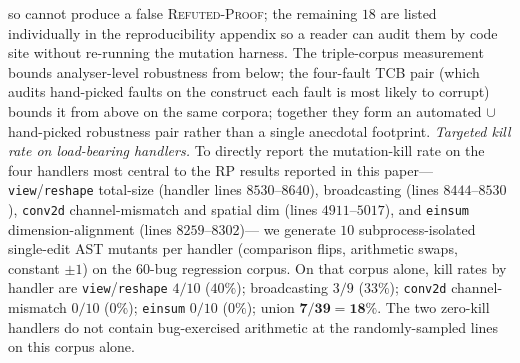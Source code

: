 so cannot produce a false \textsc{Refuted-Proof}; the remaining
$18$ are listed individually in the reproducibility appendix
so a reader can audit them by code site without re-running the
mutation harness. The triple-corpus measurement bounds analyser-level
robustness from below; the four-fault TCB pair (which audits
hand-picked faults on the construct each fault is most likely
to corrupt) bounds it from above on the same corpora; together
they form an automated $\cup$ hand-picked robustness pair rather
than a single anecdotal footprint.
\emph{Targeted kill rate on load-bearing handlers.}
To directly report the mutation-kill rate on the four handlers
most central to the RP results reported in this paper---
\texttt{view}/\texttt{reshape} total-size (handler lines
$8530$--$8640$), broadcasting (lines $8444$--$8530$),
\texttt{conv2d} channel-mismatch and spatial dim (lines $4911$--$5017$), and
\texttt{einsum} dimension-alignment (lines $8259$--$8302$)---
we generate $10$ subprocess-isolated single-edit AST mutants
per handler (comparison flips, arithmetic swaps, constant $\pm 1$)
on the $60$-bug regression corpus.
On that corpus alone, kill rates by handler are
\texttt{view}/\texttt{reshape} $4/10$ ($40\%$); broadcasting
$3/9$ ($33\%$); \texttt{conv2d} channel-mismatch $0/10$
($0\%$); \texttt{einsum} $0/10$ ($0\%$); union
$\mathbf{7/39 = 18\%}$.  The two zero-kill handlers do not
contain bug-exercised arithmetic at the randomly-sampled lines on
this corpus alone.

